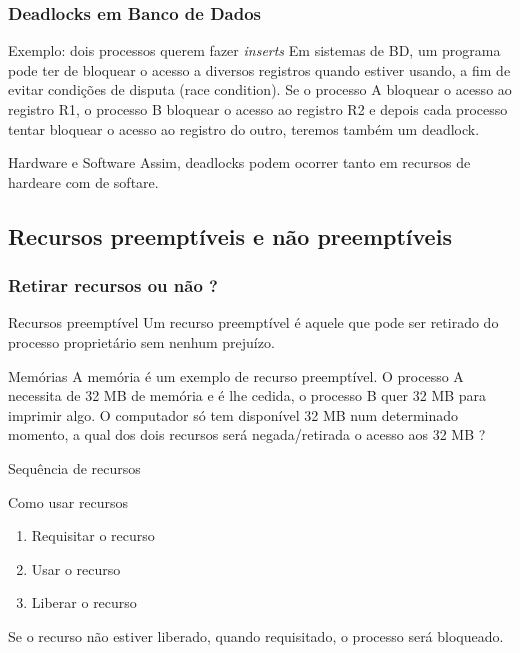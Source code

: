 \documentclass[11pt]{beamer}
\begin{document}
\begin{frame}\frametitle{ Deadlocks em Banco de Dados}

\begin{exampleblock}{ Exemplo: dois processos querem fazer \textit{inserts} }
  Em sistemas de BD, um programa pode ter de bloquear o acesso a diversos registros quando estiver usando, a fim de evitar condições de disputa 
  (race condition). Se o processo A bloquear o acesso ao registro R1, o processo B bloquear o acesso ao registro R2 e depois cada processo tentar 
  bloquear o acesso ao registro do outro, teremos também um deadlock.
\end{exampleblock}

\pause
\begin{alertblock}{ Hardware e Software}
  Assim, deadlocks podem ocorrer tanto em recursos de hardeare com de softare.
\end{alertblock}
\end{frame}


\subsection*{ Recursos preemptíveis e não preemptíveis}

\begin{frame}\frametitle{ Retirar recursos ou não ?}

\begin{block}{ Recursos preemptível}
 Um recurso preemptível é aquele que pode ser retirado do processo proprietário sem nenhum prejuízo.
\end{block}

\pause
\begin{exampleblock}{ Memórias}
  A memória é um exemplo de recurso preemptível. O processo A necessita de 32 MB de memória e é lhe cedida, o processo B quer 32 MB 
  para imprimir algo. 
  O computador só tem disponível 32 MB num determinado momento, a qual dos dois recursos será negada/retirada o acesso aos 32 MB ?
\end{exampleblock}

\end{frame}


\begin{frame}{ Sequência de recursos}

\begin{alertblock} { Como usar recursos}
\begin{enumerate}
\pause
 \item Requisitar o recurso
\pause
 \item Usar o recurso
\pause
 \item Liberar o recurso
\end{enumerate}

\end{alertblock}
\pause
 Se o recurso não estiver liberado, quando requisitado, o processo será bloqueado.
\end{frame}
\end{document}
